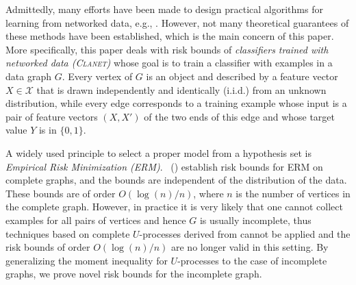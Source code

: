 \documentclass[letterpaper]{article} %
\newcommand{\xspace}{\mathcal{X}}
\newcommand{\pair}[1]{(#1)}
\newcommand{\problemabbr}{\textnormal{C}\textsc{lanet}}
\newcommand{\set}[1]{\{#1\}}
\newcommand{\red}[1]{\textcolor{red}{#1}}
\newcommand{\todo}[1]{\red{\textsc{todo:} #1}}
\newcommand{\citet}[1]{\citeauthor{#1}\ (\citeyear{#1})}
\begin{document}

Admittedly, many efforts have been made to design practical algorithms for learning from networked data, e.g., \cite{liben2007link,macskassy2007classification,li2016robust,garcia2016combining}. 
However, not many theoretical guarantees of these methods have been established, which is the main concern of this paper. More specifically, this paper deals with risk bounds of \emph{classifiers trained with networked data (\problemabbr{})
} whose goal is to train a classifier with examples in a data graph $G$. 
Every vertex of $G$ is an object and described by a feature vector $X\in \xspace{}$ that is drawn independently and identically (i.i.d.) from an unknown distribution, while every edge corresponds to a training example whose input is a pair of feature vectors $\pair{X,X'}$ of the two ends of this edge and whose target value $Y$ is in $\{0,1\}$.

A widely used principle to select a proper model from a hypothesis set is \emph{Empirical Risk Minimization (ERM)}. %
\citet{papa2016graph} establish risk bounds for ERM on complete graphs, and the bounds are independent of the distribution of the data. 
These bounds are of order $O(\log(n)/n)$, where $n$ is the number of vertices in the complete graph. 
However, in practice it is very likely that one cannot collect examples for all pairs of vertices and hence $G$ is usually incomplete, thus techniques based on complete $U$-processes derived from \cite{papa2016graph} cannot be applied and the risk bounds of order $O(\log(n)/n)$ are no longer valid in this setting. 
By generalizing the moment inequality for $U$-processes to the case of incomplete graphs, we prove novel risk bounds for the incomplete graph.  
\end{document}
